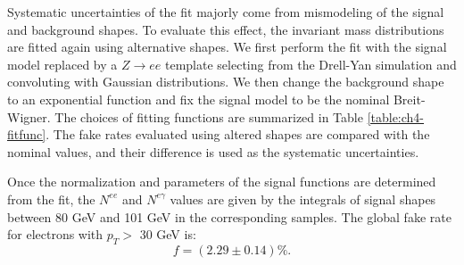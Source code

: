 \documentclass[thesis.tex]{subfiles}
\renewcommand\_{\textunderscore\allowbreak}
\begin{document}
Systematic uncertainties of the fit majorly come from mismodeling of the signal and background shapes. To evaluate this effect, the invariant mass distributions are fitted again using alternative shapes. We first perform the fit with the signal model replaced by a $Z\rightarrow ee$ template selecting from the Drell-Yan simulation and convoluting with Gaussian distributions. We then change the background shape to an exponential function and fix the signal model to be the nominal Breit-Wigner. The choices of fitting functions are summarized in Table \ref{table:ch4-fitfunc}.  The fake rates evaluated using altered shapes are compared with the nominal values, and their difference is used as the systematic uncertainties.

\begin{table}[hbt]
  \caption{Summary of the functions used to fit the tag-and-probe invariant mass. Nominal shapes in the table are used to determine the central values of the number of events in the numerator and denominator samples. Other functions are used for the measurement of systematic uncertainties.}
  \label{table:ch4-fitfunc}
\end{table}


Once the normalization and parameters of the signal functions are determined from the fit, the $N^{ee}$ and $N^{e\gamma}$ values are given by the integrals of signal shapes between 80 GeV and 101 GeV in the corresponding samples. The global fake rate for electrons with $p_T >$ 30 GeV is: 
\begin{equation}
        f = (2.29 \pm 0.14)\%.
\end{equation}
\end{document}
